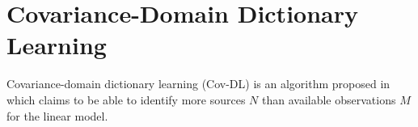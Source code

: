 \section{Covariance-Domain Dictionary Learning}\label{sec:Cov-DL}
Covariance-domain dictionary learning (Cov-DL) is an algorithm proposed in \cite{Balkan2015} which claims to be able to identify more sources $N$ than available observations $M$ for the linear model.\\

